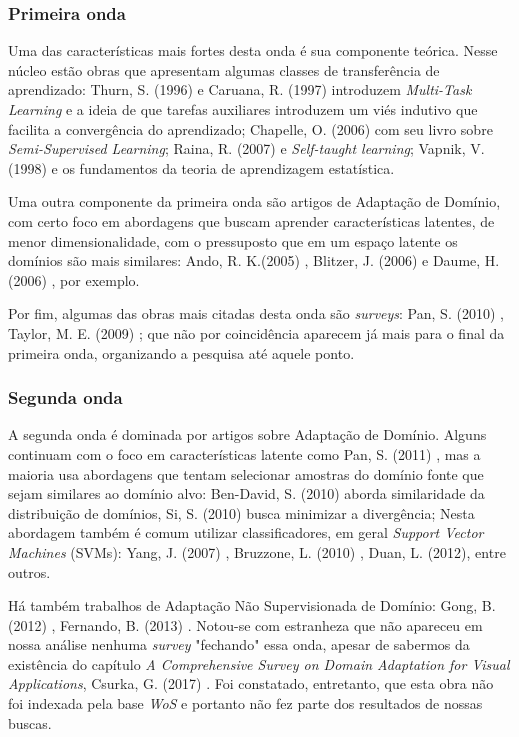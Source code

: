 \documentclass[sigconf]{acmart}
\begin{document}
\subsubsection{Primeira onda}\label{primeira_onda}
Uma das características mais fortes desta onda é sua componente teórica. Nesse núcleo estão obras que apresentam algumas classes de transferência de aprendizado: Thurn, S. (1996) \cite{thrun1996learning} e Caruana, R. (1997) \cite{Caruana1997} introduzem \emph{Multi-Task Learning} e a ideia de que tarefas auxiliares introduzem um viés indutivo que facilita a convergência do aprendizado; Chapelle, O. (2006) \cite{Chapelle:2010:SL:1841234} com seu livro sobre \emph{Semi-Supervised Learning}; Raina, R. (2007) e \emph{Self-taught learning}; Vapnik, V. (1998) \cite{Vapnik1998} e os fundamentos da teoria de aprendizagem estatística.

Uma outra componente da primeira onda são artigos de Adaptação de Domínio, com certo foco em abordagens que buscam aprender características latentes, de menor dimensionalidade, com o pressuposto que em um espaço latente os domínios são mais similares: Ando, R. K.(2005) \cite{ando2005framework}, Blitzer, J. (2006) \cite{Blitzer:2006:DAS:1610075.1610094} e Daume, H. (2006) \cite{DaumeIII2006}, por exemplo. 

Por fim, algumas das obras mais citadas desta onda são \emph{surveys}: Pan, S. (2010) \cite{PanYang}, Taylor, M. E. (2009) \cite{Taylor:2009:TLR:1577069.1755839}; que não por coincidência aparecem já mais para o final da primeira onda, organizando a pesquisa até aquele ponto. 

\subsubsection{Segunda onda}\label{segunda_onda}
A segunda onda é dominada por artigos sobre Adaptação de Domínio.  Alguns continuam com o foco em características latente como Pan, S. (2011) \cite{Pan2011}, mas a maioria usa abordagens que tentam selecionar amostras do domínio fonte que sejam similares ao domínio alvo: Ben-David, S. (2010) \cite{BenDavid2009} aborda similaridade da distribuição de domínios, Si, S. (2010) \cite{SiSi2010} busca minimizar a divergência; Nesta abordagem também é comum utilizar classificadores, em geral \emph{Support Vector Machines} (SVMs): Yang, J. (2007) \cite{Yang2007}, Bruzzone, L. (2010) \cite{Bruzzone2010}, Duan, L. (2012)\cite{LixinDuan2012}, entre outros.

Há também trabalhos de Adaptação Não Supervisionada de Domínio: Gong, B. (2012) \cite{BoqingGong2012}, Fernando, B. (2013) \cite{Fernando2013}.
Notou-se com estranheza que não apareceu em nossa análise nenhuma \emph{survey} "fechando" essa onda, apesar de sabermos da existência do capítulo \emph{A Comprehensive Survey on Domain Adaptation for Visual Applications}, Csurka, G. (2017) \cite{Csurka2017}. Foi constatado, entretanto, que esta obra não foi indexada pela base \emph{WoS} e portanto não fez parte dos resultados de nossas buscas. 
\end{document}
